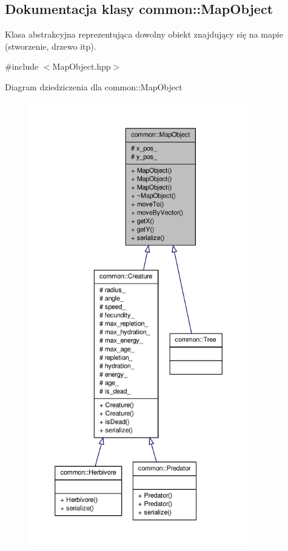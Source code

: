 \hypertarget{classcommon_1_1MapObject}{\subsection{Dokumentacja klasy common\-:\-:Map\-Object}
\label{classcommon_1_1MapObject}
}


Klasa abstrakcyjna reprezentująca dowolny obiekt znajdujący się na mapie (stworzenie, drzewo itp).  




{\ttfamily \#include $<$Map\-Object.\-hpp$>$}



Diagram dziedziczenia dla common\-:\-:Map\-Object
\nopagebreak
\begin{figure}[H]
\begin{center}
\leavevmode
\includegraphics[height=550pt]{classcommon_1_1MapObject__inherit__graph}
\end{center}
\end{figure}


